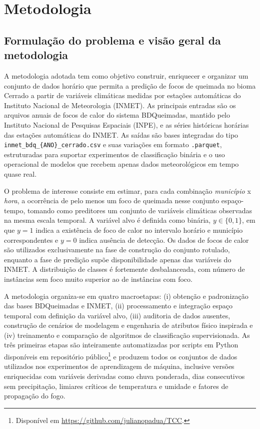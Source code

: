 
\chapter{Metodologia}
\label{cap:metodologia}

\section{Formulação do problema e visão geral da metodologia}
\label{sec:metodologia-visao-geral}

A metodologia adotada tem como objetivo construir, enriquecer e organizar um conjunto de dados horário que permita a predição de focos de queimada no bioma Cerrado a partir de variáveis climáticas medidas por estações automáticas do Instituto Nacional de Meteorologia (INMET). As principais entradas são os arquivos anuais de focos de calor do sistema BDQueimadas, mantido pelo Instituto Nacional de Pesquisas Espaciais (INPE), e as séries históricas horárias das estações automáticas do INMET. As saídas são bases integradas do tipo \texttt{inmet\_bdq\_\{ANO\}\_cerrado.csv} e suas variações em formato \texttt{.parquet}, estruturadas para suportar experimentos de classificação binária e o uso operacional de modelos que recebem apenas dados meteorológicos em tempo quase real.

O problema de interesse consiste em estimar, para cada combinação \textit{município} x \textit{hora}, a ocorrência de pelo menos um foco de queimada nesse conjunto espaço-tempo, tomando como preditores um conjunto de variáveis climáticas observadas na mesma escala temporal. A variável alvo é definida como binária, $y \in \{0, 1\}$, em que $y = 1$ indica a existência de foco de calor no intervalo horário e município correspondentes e $y = 0$ indica ausência de detecção. Os dados de focos de calor são utilizados exclusivamente na fase de construção do conjunto rotulado, enquanto a fase de predição supõe disponibilidade apenas das variáveis do INMET. A distribuição de classes é fortemente desbalanceada, com número de instâncias sem foco muito superior ao de instâncias com foco.

A metodologia organiza-se em quatro macroetapas: (i) obtenção e padronização das bases BDQueimadas e INMET, (ii) processamento e integração espaço temporal com definição da variável alvo, (iii) auditoria de dados ausentes, construção de cenários de modelagem e engenharia de atributos físico inspirada e (iv) treinamento e comparação de algoritmos de classificação supervisionada. As três primeiras etapas são inteiramente automatizadas por scripts em Python disponíveis em repositório público\footnote{Disponível em \url{https://github.com/julianopadua/TCC}.} e produzem todos os conjuntos de dados utilizados nos experimentos de aprendizagem de máquina, inclusive versões enriquecidas com variáveis derivadas como chuva ponderada, dias consecutivos sem precipitação, limiares críticos de temperatura e umidade e fatores de propagação do fogo.

